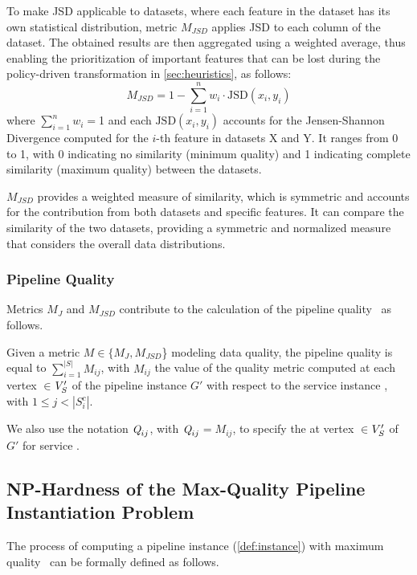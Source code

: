 To make JSD applicable to datasets, where each feature in the dataset has its own statistical distribution, metric $M_{JSD}$ applies JSD to each column of the dataset. The obtained results are then aggregated using a weighted average, thus enabling the prioritization of important features that can be lost during the policy-driven transformation in \cref{sec:heuristics}, as follows: \[M_{JSD} = 1 - \sum_{i=1}^n w_i \cdot \text{JSD}(x_i,y_i)\]
where $\sum_{i=1}^n w_i$$=$1 and each \(\text{JSD}(x_i,y_i)\) accounts for the Jensen-Shannon Divergence computed for the \(i\)-th feature in datasets X and Y. It ranges from 0 to 1, with 0 indicating no similarity (minimum quality) and 1 indicating complete similarity (maximum quality) between the datasets.

$M_{JSD}$ provides a weighted measure of similarity, which is symmetric and accounts for the contribution from both datasets and specific features. It can compare the similarity of the two datasets, providing a symmetric and normalized measure that considers the overall data distributions.


\subsubsection{Pipeline Quality}
Metrics $M_J$ and $M_{JSD}$ contribute to the calculation of the pipeline quality \q\ as follows.
\vspace{0.5em}

\begin{definition}[\emph{\PipQuality}]\label{def:quality}
Given a metric $M$$\in$$\{M_J,M_{JSD}$\} modeling data quality, the pipeline quality \q is equal to $\sum_{i=1}^{|S|}M_{ij}$, with $M_{ij}$ the value of the quality metric computed at each vertex $\in$$V'_S$ of the pipeline instance $G'$ with respect to the service instance , with $1 \leq j <  |S^c_{i}|$.
\end{definition}

\vspace{0.5em}
We also use the notation $\textit{Q}_{ij}$, with $\textit{Q}_{ij}$$=$$M_{ij}$, to specify the \quality at vertex $\in$$V'_S$ of $G'$ for service .

\subsection{NP-Hardness of the Max-Quality Pipeline Instantiation Problem}\label{sec:nphard}
The process of computing a pipeline instance (\cref{def:instance}) with maximum quality \q\ can be formally defined as follows.
\vspace{0.5em}

